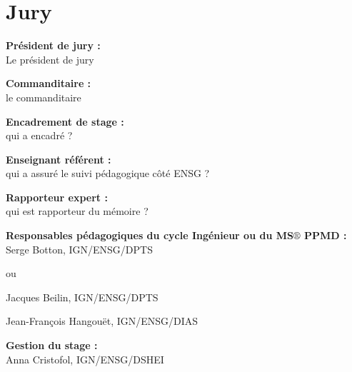 \thispagestyle{plain}
\section*{Jury}
\vspace{0.5cm}

\textbf{Président de jury :} \\

Le président de jury

\vspace{0.5cm}

\textbf{Commanditaire :} \\

le commanditaire

\vspace{0.5cm}

\textbf{Encadrement de stage :} \\ 


qui a encadré ?

\vspace{0.5cm}

\textbf{Enseignant référent :} \\ 

qui a assuré le suivi pédagogique côté ENSG ?

\vspace{0.5cm}

\textbf{Rapporteur expert :} \\ 

qui est rapporteur du mémoire ?

\vspace{0.5cm}

\textbf{Responsable{\color{magenta}s} pédagogique{\color{magenta}s} du {\color{red} cycle Ingénieur} ou du {\color{magenta}MS$\circledR$ PPMD} :} \\



{\color{red}Serge Botton, IGN/ENSG/DPTS}

ou 

{\color{magenta}
Jacques Beilin, IGN/ENSG/DPTS

Jean-François Hangouët, IGN/ENSG/DIAS
}

\vspace{0.5cm}

\textbf{Gestion du stage :} \\ 

Anna Cristofol, IGN/ENSG/DSHEI

\vspace{0.5cm}

